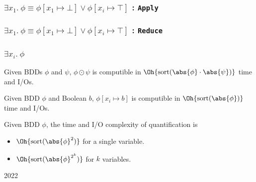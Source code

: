 \documentclass[english, aspectratio=169]{beamer}
\newcommand{\sort}[1]{\text{sort}(#1)}
\begin{document}
\begin{frame}
  \frametitle{$\exists x_1 .\ \phi \equiv \phi[x_1 \mapsto \bot] \lor \phi[x_i \mapsto \top]$ : \texttt{Apply}}

  \centering
  
\end{frame}

\begin{frame}
  \frametitle{$\exists x_1 .\ \phi \equiv \phi[x_1 \mapsto \bot] \lor \phi[x_i \mapsto \top]$ : \texttt{Reduce}}

  \centering
  
\end{frame}

\begin{frame}
  \frametitle{$\exists x_i .\ \phi$}

  \begin{theorem}
    Given BDDs $\phi$ and $\psi$, $\phi \odot \psi$ is computible in
    $\Oh{\sort{\abs{\phi} \cdot \abs{\psi}}}$ time and I/Os.
  \end{theorem}

  \medskip

  \begin{theorem}[S{\o}lvsten et al.~'22]
    Given BDD $\phi$ and Boolean $b$, $\phi[x_i \mapsto b]$ is computible in
    $\Oh{\sort{\abs{\phi}}}$ time and I/Os.
  \end{theorem}

  \medskip\pause

  \begin{corollary}[S{\o}lvsten et al.~'22]
    Given BDD $\phi$, the time and I/O complexity of quantification is
    \vspace{-8pt}
    \begin{itemize}
    \item $\Oh{\sort{\abs{\phi}^2}}$ for a single variable.
    \item $\Oh{\sort{\abs{\phi}^{2^k}}}$ for $k$ variables.
    \end{itemize}
  \end{corollary}
\end{frame}

\begin{frame}

  \begin{center}
    \bf
    {\fontsize{42}{50}\selectfont {}}

    \vspace{10pt}

    {\Huge 2022}
  \end{center}
\end{frame}
\end{document}
